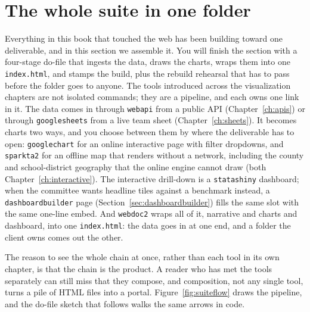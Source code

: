 \documentclass[
    a4paper,
    fontsize=10pt,
    twoside=true,
    numbers=noenddot,
]{kaobook}
\begin{document}
\section{The whole suite in one folder}\label{sec:capstone}
Everything in this book that touched the web has been building toward one deliverable, and in this section we assemble it. You will finish the section with a four-stage do-file that ingests the data, draws the charts, wraps them into one \texttt{index.html}, and stamps the build, plus the rebuild rehearsal that has to pass before the folder goes to anyone. The tools introduced across the visualization chapters are not isolated commands; they are a pipeline, and each owns one link in it. The data comes in through \texttt{webapi} from a public API (Chapter~\ref{ch:apis}) or through \texttt{googlesheets} from a live team sheet (Chapter~\ref{ch:sheets}). It becomes charts two ways, and you choose between them by where the deliverable has to open: \texttt{googlechart} for an online interactive page with filter dropdowns, and \texttt{sparkta2} for an offline map that renders without a network, including the county and school-district geography that the online engine cannot draw (both Chapter~\ref{ch:interactive}). The interactive drill-down is a \texttt{statashiny} dashboard; when the committee wants headline tiles against a benchmark instead, a \texttt{dashboardbuilder} page (Section~\ref{sec:dashboardbuilder}) fills the same slot with the same one-line embed. And \texttt{webdoc2} wraps all of it, narrative and charts and dashboard, into one \texttt{index.html}: the data goes in at one end, and a folder the client owns comes out the other.

The reason to see the whole chain at once, rather than each tool in its own chapter, is that the chain is the product. A reader who has met the tools separately can still miss that they compose, and composition, not any single tool, turns a pile of HTML files into a portal. Figure~\ref{fig:suiteflow} draws the pipeline, and the do-file sketch that follows walks the same arrows in code.
\end{document}
